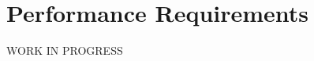 \documentclass[../../rasd.tex]{subfiles}
\begin{document}
\section{Performance Requirements}
		WORK IN PROGRESS
\end{document}
